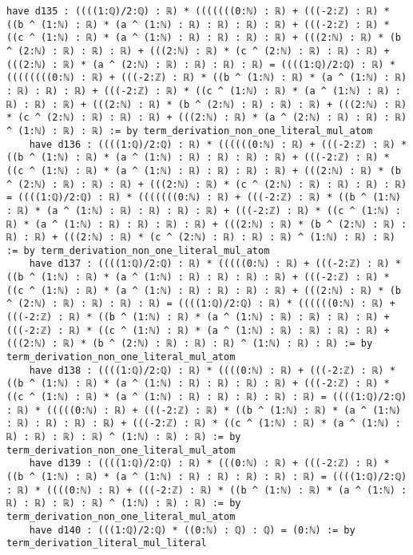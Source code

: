 \documentclass{article}
\begin{document}
\begin{tcolorbox}[colback=white!10, width=\linewidth]
\begin{lstlisting}[language=Lean4]
    have d135 : ((((1:ℚ)/2:ℚ) : ℝ) * (((((((0:ℕ) : ℝ) + (((-2:ℤ) : ℝ) * ((b ^ (1:ℕ) : ℝ) * (a ^ (1:ℕ) : ℝ) : ℝ) : ℝ) : ℝ) + (((-2:ℤ) : ℝ) * ((c ^ (1:ℕ) : ℝ) * (a ^ (1:ℕ) : ℝ) : ℝ) : ℝ) : ℝ) + (((2:ℕ) : ℝ) * (b ^ (2:ℕ) : ℝ) : ℝ) : ℝ) + (((2:ℕ) : ℝ) * (c ^ (2:ℕ) : ℝ) : ℝ) : ℝ) + (((2:ℕ) : ℝ) * (a ^ (2:ℕ) : ℝ) : ℝ) : ℝ) : ℝ) = ((((1:ℚ)/2:ℚ) : ℝ) * ((((((((0:ℕ) : ℝ) + (((-2:ℤ) : ℝ) * ((b ^ (1:ℕ) : ℝ) * (a ^ (1:ℕ) : ℝ) : ℝ) : ℝ) : ℝ) + (((-2:ℤ) : ℝ) * ((c ^ (1:ℕ) : ℝ) * (a ^ (1:ℕ) : ℝ) : ℝ) : ℝ) : ℝ) + (((2:ℕ) : ℝ) * (b ^ (2:ℕ) : ℝ) : ℝ) : ℝ) + (((2:ℕ) : ℝ) * (c ^ (2:ℕ) : ℝ) : ℝ) : ℝ) + (((2:ℕ) : ℝ) * (a ^ (2:ℕ) : ℝ) : ℝ) : ℝ) ^ (1:ℕ) : ℝ) : ℝ) := by term_derivation_non_one_literal_mul_atom
    have d136 : ((((1:ℚ)/2:ℚ) : ℝ) * ((((((0:ℕ) : ℝ) + (((-2:ℤ) : ℝ) * ((b ^ (1:ℕ) : ℝ) * (a ^ (1:ℕ) : ℝ) : ℝ) : ℝ) : ℝ) + (((-2:ℤ) : ℝ) * ((c ^ (1:ℕ) : ℝ) * (a ^ (1:ℕ) : ℝ) : ℝ) : ℝ) : ℝ) + (((2:ℕ) : ℝ) * (b ^ (2:ℕ) : ℝ) : ℝ) : ℝ) + (((2:ℕ) : ℝ) * (c ^ (2:ℕ) : ℝ) : ℝ) : ℝ) : ℝ) = ((((1:ℚ)/2:ℚ) : ℝ) * (((((((0:ℕ) : ℝ) + (((-2:ℤ) : ℝ) * ((b ^ (1:ℕ) : ℝ) * (a ^ (1:ℕ) : ℝ) : ℝ) : ℝ) : ℝ) + (((-2:ℤ) : ℝ) * ((c ^ (1:ℕ) : ℝ) * (a ^ (1:ℕ) : ℝ) : ℝ) : ℝ) : ℝ) + (((2:ℕ) : ℝ) * (b ^ (2:ℕ) : ℝ) : ℝ) : ℝ) + (((2:ℕ) : ℝ) * (c ^ (2:ℕ) : ℝ) : ℝ) : ℝ) ^ (1:ℕ) : ℝ) : ℝ) := by term_derivation_non_one_literal_mul_atom
    have d137 : ((((1:ℚ)/2:ℚ) : ℝ) * (((((0:ℕ) : ℝ) + (((-2:ℤ) : ℝ) * ((b ^ (1:ℕ) : ℝ) * (a ^ (1:ℕ) : ℝ) : ℝ) : ℝ) : ℝ) + (((-2:ℤ) : ℝ) * ((c ^ (1:ℕ) : ℝ) * (a ^ (1:ℕ) : ℝ) : ℝ) : ℝ) : ℝ) + (((2:ℕ) : ℝ) * (b ^ (2:ℕ) : ℝ) : ℝ) : ℝ) : ℝ) = ((((1:ℚ)/2:ℚ) : ℝ) * ((((((0:ℕ) : ℝ) + (((-2:ℤ) : ℝ) * ((b ^ (1:ℕ) : ℝ) * (a ^ (1:ℕ) : ℝ) : ℝ) : ℝ) : ℝ) + (((-2:ℤ) : ℝ) * ((c ^ (1:ℕ) : ℝ) * (a ^ (1:ℕ) : ℝ) : ℝ) : ℝ) : ℝ) + (((2:ℕ) : ℝ) * (b ^ (2:ℕ) : ℝ) : ℝ) : ℝ) ^ (1:ℕ) : ℝ) : ℝ) := by term_derivation_non_one_literal_mul_atom
    have d138 : ((((1:ℚ)/2:ℚ) : ℝ) * ((((0:ℕ) : ℝ) + (((-2:ℤ) : ℝ) * ((b ^ (1:ℕ) : ℝ) * (a ^ (1:ℕ) : ℝ) : ℝ) : ℝ) : ℝ) + (((-2:ℤ) : ℝ) * ((c ^ (1:ℕ) : ℝ) * (a ^ (1:ℕ) : ℝ) : ℝ) : ℝ) : ℝ) : ℝ) = ((((1:ℚ)/2:ℚ) : ℝ) * (((((0:ℕ) : ℝ) + (((-2:ℤ) : ℝ) * ((b ^ (1:ℕ) : ℝ) * (a ^ (1:ℕ) : ℝ) : ℝ) : ℝ) : ℝ) + (((-2:ℤ) : ℝ) * ((c ^ (1:ℕ) : ℝ) * (a ^ (1:ℕ) : ℝ) : ℝ) : ℝ) : ℝ) ^ (1:ℕ) : ℝ) : ℝ) := by term_derivation_non_one_literal_mul_atom
    have d139 : ((((1:ℚ)/2:ℚ) : ℝ) * (((0:ℕ) : ℝ) + (((-2:ℤ) : ℝ) * ((b ^ (1:ℕ) : ℝ) * (a ^ (1:ℕ) : ℝ) : ℝ) : ℝ) : ℝ) : ℝ) = ((((1:ℚ)/2:ℚ) : ℝ) * ((((0:ℕ) : ℝ) + (((-2:ℤ) : ℝ) * ((b ^ (1:ℕ) : ℝ) * (a ^ (1:ℕ) : ℝ) : ℝ) : ℝ) : ℝ) ^ (1:ℕ) : ℝ) : ℝ) := by term_derivation_non_one_literal_mul_atom
    have d140 : (((1:ℚ)/2:ℚ) * ((0:ℕ) : ℚ) : ℚ) = (0:ℕ) := by term_derivation_literal_mul_literal

\end{lstlisting}
\end{tcolorbox}
\end{document}
